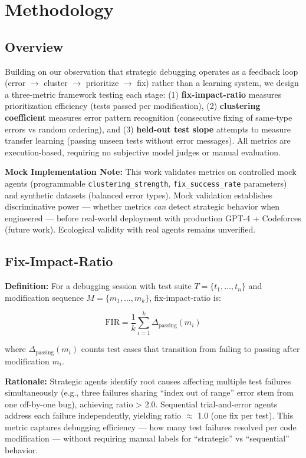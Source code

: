 \section{Methodology}

\subsection{Overview}

Building on our observation that strategic debugging operates as a feedback loop (error $\rightarrow$ cluster $\rightarrow$ prioritize $\rightarrow$ fix) rather than a learning system, we design a three-metric framework testing each stage: (1) \textbf{fix-impact-ratio} measures prioritization efficiency (tests passed per modification), (2) \textbf{clustering coefficient} measures error pattern recognition (consecutive fixing of same-type errors vs random ordering), and (3) \textbf{held-out test slope} attempts to measure transfer learning (passing unseen tests without error messages). All metrics are execution-based, requiring no subjective model judges or manual evaluation.

\textbf{Mock Implementation Note:} This work validates metrics on controlled mock agents (programmable \texttt{clustering\_strength}, \texttt{fix\_success\_rate} parameters) and synthetic datasets (balanced error types). Mock validation establishes discriminative power — whether metrics \emph{can} detect strategic behavior when engineered — before real-world deployment with production GPT-4 + Codeforces (future work). Ecological validity with real agents remains unverified.

\subsection{Fix-Impact-Ratio}

\textbf{Definition:} For a debugging session with test suite $T = \{t_1, \ldots, t_n\}$ and modification sequence $M = \{m_1, \ldots, m_k\}$, fix-impact-ratio is:

\begin{equation}
\text{FIR} = \frac{1}{k} \sum_{i=1}^{k} \Delta_{\text{passing}}(m_i)
\end{equation}

where $\Delta_{\text{passing}}(m_i)$ counts test cases that transition from failing to passing after modification $m_i$.

\textbf{Rationale:} Strategic agents identify root causes affecting multiple test failures simultaneously (e.g., three failures sharing ``index out of range'' error stem from one off-by-one bug), achieving ratio > 2.0. Sequential trial-and-error agents address each failure independently, yielding ratio $\approx$ 1.0 (one fix per test). This metric captures debugging efficiency — how many test failures resolved per code modification — without requiring manual labels for ``strategic'' vs ``sequential'' behavior.

